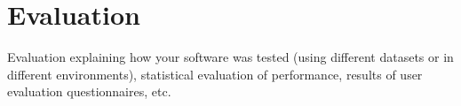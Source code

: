 \section{Evaluation}

{\color{red} Evaluation explaining how your software was tested (using different datasets or in different environments), statistical evaluation of performance, results of user evaluation questionnaires, etc. }